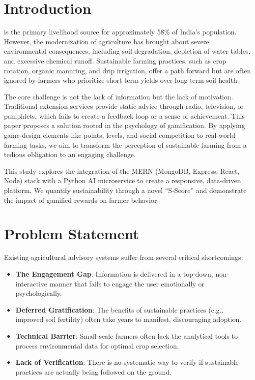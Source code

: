 \documentclass[journal]{IEEEtran}
\begin{document}
\section{Introduction}
 is the primary livelihood source for approximately 58\% of India's population. However, the modernization of agriculture has brought about severe environmental consequences, including soil degradation, depletion of water tables, and excessive chemical runoff. Sustainable farming practices, such as crop rotation, organic manuring, and drip irrigation, offer a path forward but are often ignored by farmers who prioritize short-term yields over long-term soil health.

The core challenge is not the lack of information but the lack of motivation. Traditional extension services provide static advice through radio, television, or pamphlets, which fails to create a feedback loop or a sense of achievement. This paper proposes a solution rooted in the psychology of gamification. By applying game-design elements like points, levels, and social competition to real-world farming tasks, we aim to transform the perception of sustainable farming from a tedious obligation to an engaging challenge.

This study explores the integration of the MERN (MongoDB, Express, React, Node) stack with a Python AI microservice to create a responsive, data-driven platform. We quantify sustainability through a novel ``S-Score'' and demonstrate the impact of gamified rewards on farmer behavior.

\section{Problem Statement}
Existing agricultural advisory systems suffer from several critical shortcomings:
\begin{itemize}
    \item \textbf{The Engagement Gap}: Information is delivered in a top-down, non-interactive manner that fails to engage the user emotionally or psychologically.
    \item \textbf{Deferred Gratification}: The benefits of sustainable practices (e.g., improved soil fertility) often take years to manifest, discouraging adoption.
    \item \textbf{Technical Barrier}: Small-scale farmers often lack the analytical tools to process environmental data for optimal crop selection.
    \item \textbf{Lack of Verification}: There is no systematic way to verify if sustainable practices are actually being followed on the ground.
\end{itemize}
\end{document}
